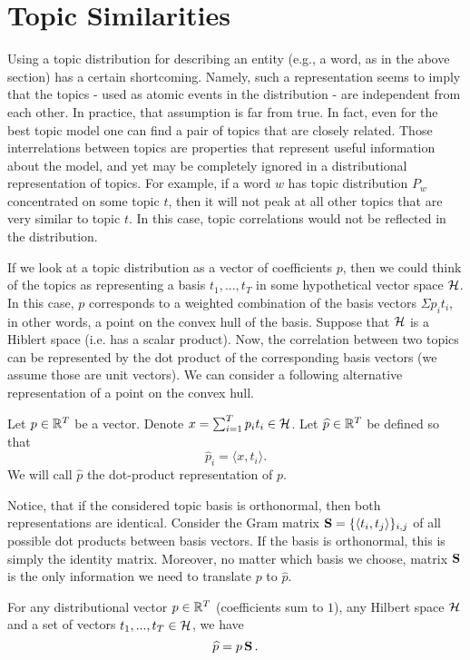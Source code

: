 \documentclass{article}
\begin{document}
\section{Topic Similarities}
\label{sec:topic-similarities}
Using a topic distribution for describing an entity (e.g., a word, as in
the above section) has a certain
shortcoming. Namely, such a representation seems to imply that the
topics - used as atomic events in the distribution - are independent
from each other. In practice, that assumption is far from true. In
fact, even for the best topic model one can find a pair of topics that
are closely related. Those interrelations between topics are
properties that represent useful information about the model, and yet
may be completely ignored in a distributional representation of
topics. For example, if a word $w$ has topic distribution $P_w$
concentrated on some topic $t$, then it will 
not peak at all other topics that are very similar to
topic $t$. In this case, topic correlations would not be reflected in
the distribution. 

If we look at a topic distribution as a vector of coefficients $p$, then
we could think of the topics as representing a basis $t_1,...,t_T$ in
some hypothetical vector space ${\mathcal H}$. In 
this case, $p$ corresponds to a weighted combination of the basis
vectors $\Sigma p_i t_i$, in other words, a point on the convex hull of the basis.
Suppose that ${\mathcal H}$ is a Hiblert space (i.e. has a scalar
product). Now, the correlation between two topics can be represented
by the dot product of the corresponding basis vectors (we assume those
are unit vectors). We can consider a following alternative representation
of a point on the convex hull.

\bed
Let $p\in{\mathbb R}^T$ be a vector. Denote $x=\sum_{i=1}^T p_i
t_i\in{\mathcal H}$. Let $\widehat{p}\in{\mathbb R}^T$ be defined so that
\[\widehat{p}_i = \langle x,t_i\rangle.\]
We will call $\widehat{p}$ the dot-product representation of $p$.
\eed

Notice, that if the considered topic basis is orthonormal, then both
representations are identical. Consider the Gram matrix
$\operatorname{\mathbf{S}}=\{\langle t_i,t_j\rangle\}_{i,j}$ of all possible dot products between
basis vectors. If the basis is orthonormal, this is simply the identity
matrix. Moreover, no matter which basis we choose, matrix $\operatorname{\mathbf{S}}$ is the
only information we need to translate $p$ to $\widehat{p}$.

\ber
For any distributional vector $p\in{\mathbb R}^T$ (coefficients
sum to $1$), any Hilbert space ${\mathcal H}$ and a set of
vectors $t_1,...,t_T\in{\mathcal H}$, we have 
\[\widehat{p} = p\operatorname{\mathbf{S}}.\]
\eer
\end{document}
